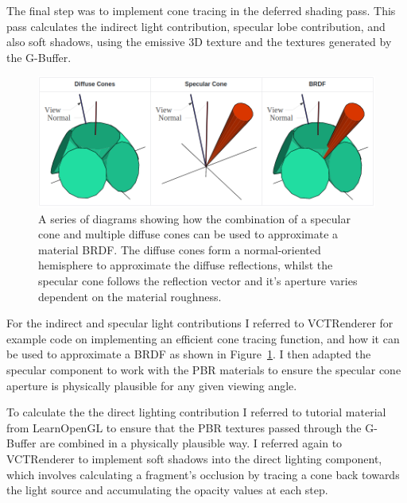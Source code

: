 \documentclass[]{acmsiggraph}
\begin{document}
The final step was to implement cone tracing in the deferred shading pass. This pass calculates the indirect light contribution, specular lobe contribution, and also soft shadows, using the emissive 3D texture and the textures generated by the G-Buffer.

\begin{figure}[htbp]\centering
\includegraphics[width=1.0\linewidth]{images/BRDF}
\caption{\label{figure:BRDF} A series of diagrams showing how the combination of a specular cone and multiple diffuse cones can be used to approximate a material BRDF. \protect\cite{Villegas2016} The diffuse cones form a normal-oriented hemisphere to approximate the diffuse reflections, whilst the specular cone follows the reflection vector and it's aperture varies dependent on the material roughness.}
\end{figure}

For the indirect and specular light contributions I referred to VCTRenderer \cite{Villegas2016} for example code on implementing an efficient cone tracing function, and how it can be used to approximate a BRDF as shown in Figure~\ref{figure:BRDF}. I then adapted the specular component to work with the PBR materials to ensure the specular cone aperture is physically plausible for any given viewing angle.

To calculate the the direct lighting contribution I referred to tutorial material from LearnOpenGL \cite{learnPBR} to ensure that the PBR textures passed through the G-Buffer are combined in a physically plausible way. I referred again to VCTRenderer \cite{Villegas2016} to implement soft shadows into the direct lighting component, which involves calculating a fragment's occlusion by tracing a cone back towards the light source and accumulating the opacity values at each step.
\end{document}
